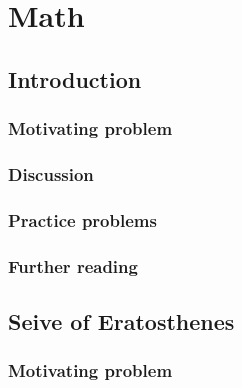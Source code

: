 \section{Math}

\subsection{Introduction}

\subsubsection*{Motivating problem}







\subsubsection*{Discussion}

\subsubsection*{Practice problems}

\subsubsection*{Further reading}

\subsection{Seive of Eratosthenes}

\subsubsection*{Motivating problem}






